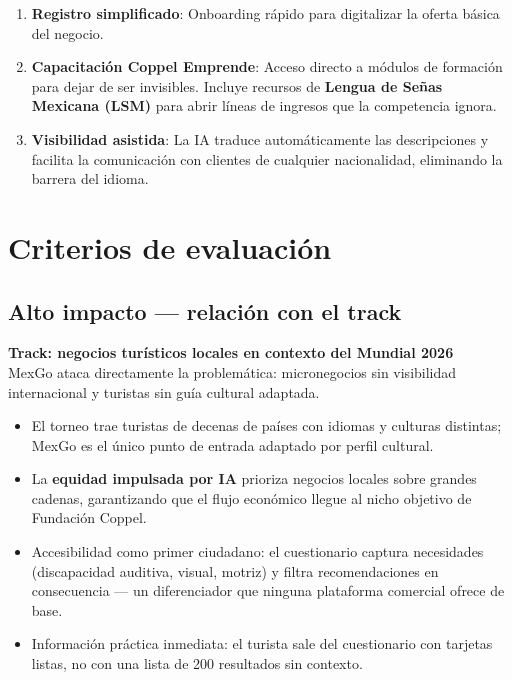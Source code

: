 \documentclass[11pt,a4paper]{article}
\newcommand{\criterio}[2]{
  \vspace{0.3cm}
  \noindent\colorbox{primary!10}{\parbox{\dimexpr\linewidth-2\fboxsep}{%
    \textbf{\textcolor{primary}{#1}}\\[2pt]
    \small\textcolor{dark}{#2}
  }}
  \vspace{0.3cm}
}
\begin{document}
\begin{enumerate}[leftmargin=*, itemsep=3pt]
  \item \textbf{Registro simplificado}: Onboarding rápido para digitalizar
        la oferta básica del negocio.
  \item \textbf{Capacitación Coppel Emprende}: Acceso directo a módulos de
        formación para dejar de ser invisibles. Incluye recursos de
        \textbf{Lengua de Señas Mexicana (LSM)} para abrir líneas de ingresos
        que la competencia ignora.
  \item \textbf{Visibilidad asistida}: La IA traduce automáticamente las
        descripciones y facilita la comunicación con clientes de cualquier
        nacionalidad, eliminando la barrera del idioma.
\end{enumerate}

\section{Criterios de evaluación}

\subsection{Alto impacto — relación con el track}

\criterio{Track: negocios turísticos locales en contexto del Mundial 2026}
{MexGo ataca directamente la problemática: micronegocios sin visibilidad
internacional y turistas sin guía cultural adaptada.}

\begin{itemize}[leftmargin=*, itemsep=2pt]
  \item El torneo trae turistas de decenas de países con idiomas y culturas
        distintas; MexGo es el único punto de entrada adaptado por perfil cultural.
  \item La \textbf{equidad impulsada por IA} prioriza negocios locales sobre grandes cadenas,
        garantizando que el flujo económico llegue al nicho objetivo de Fundación Coppel.
  \item Accesibilidad como primer ciudadano: el cuestionario captura necesidades
        (discapacidad auditiva, visual, motriz) y filtra recomendaciones en consecuencia
        — un diferenciador que ninguna plataforma comercial ofrece de base.
  \item Información práctica inmediata: el turista sale del cuestionario con
        tarjetas listas, no con una lista de 200 resultados sin contexto.
\end{itemize}
\end{document}
